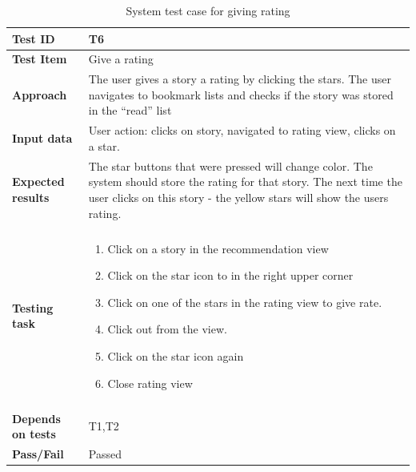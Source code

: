 \begin{appendices}
\begin{table}[H]
	\label{Tab:systemTesting5}
	\end{table}
	


	\begin{table}[H]
		\small
		\centering
		\caption{System test case for giving rating}
		\begin{tabular}{ | l | l  |}
			\hline
			\textbf{Test ID} & T6  \\ \hline
			\textbf{Test Item} & Give a rating \\ \hline
			\textbf{Approach} & \begin{minipage}{5in}The user gives a story a rating by clicking the stars. The user navigates to bookmark lists and checks if the story was stored in the “read” list \end{minipage}\\ \hline
			\textbf{Input data} &  \begin{minipage}{5in}User action: clicks on story, navigated to rating view, clicks on a star. \end{minipage}\\ \hline
			\textbf{Expected results} & \begin{minipage}{5in}The star buttons that were pressed will change color.  The system should store the rating for that story. The next time the user clicks on this story - the yellow stars will show the users rating.  \end{minipage}\\ \hline&\\[-3.8ex]
			\textbf{Testing task} & \begin{minipage}{5in}
			\begin{enumerate}[noitemsep]
			\item Click on a story in the recommendation view
			\item Click on the star icon to in the right upper corner
			\item Click on one of the stars in the rating view to give rate.
			\item Click out from the view. 
			\item Click on the star icon again
			\item Close rating view
			\end{enumerate}\end{minipage}
			\\ &\\[-3.8ex]\hline
			\textbf{Depends on tests} & T1,T2 \\ \hline		
			\textbf{Pass/Fail} & Passed \\\hline			
		\end{tabular}
	\label{Tab_systemTesting6}
	\end{table}





\end{appendices}
